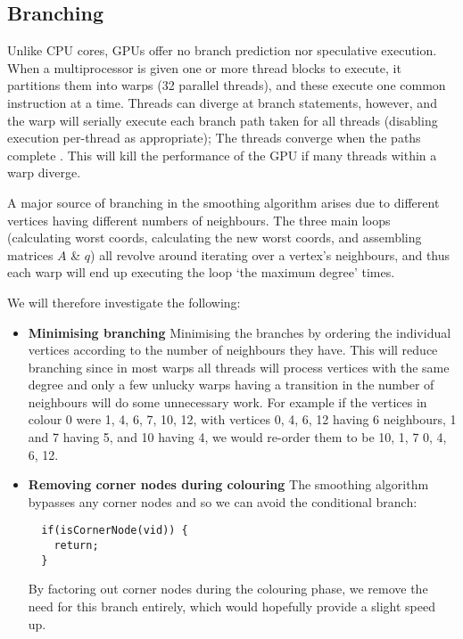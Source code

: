 \subsection*{Branching}
Unlike CPU cores, GPUs offer no branch prediction nor speculative execution.
When a multiprocessor is given one or more thread blocks to execute, it partitions them into warps (32 parallel threads), and these execute one common instruction at a time.
Threads can diverge at branch statements, however, and the warp will serially execute each branch path taken for all threads (disabling execution per-thread as appropriate); The threads converge when the paths complete \cite{cuda_guide}. This will kill the performance of the GPU if many threads within a warp diverge.

A major source of branching in the smoothing algorithm arises due to different vertices having different numbers of neighbours. The three main loops (calculating worst coords, calculating the new worst coords, and assembling matrices $A$ \& $q$) all revolve around iterating over a vertex's neighbours, and thus each warp will end up executing the loop `the maximum degree' times.

We will therefore investigate the following:
\begin{itemize}
  \item \textbf{Minimising branching}
                Minimising the branches by ordering the individual vertices according to the number of neighbours they have. This will reduce branching since in most warps all threads will process vertices with the same degree and only a few unlucky warps having a transition in the number of neighbours will do some unnecessary work.
                For example if the vertices in colour 0 were 1, 4, 6, 7, 10, 12, with vertices 0, 4, 6, 12 having 6 neighbours, 1 and 7 having 5, and 10 having 4, we would re-order them to be 10, 1, 7 0, 4, 6, 12.

  \item \textbf{Removing corner nodes during colouring}
                The smoothing algorithm bypasses any corner nodes and so we can avoid the conditional branch:
                \begin{verbatim}
  if(isCornerNode(vid)) {
    return;
  }
                \end{verbatim}
                By factoring out corner nodes during the colouring phase, we remove the need for this branch entirely, which would hopefully provide a slight speed up.
\end{itemize}
